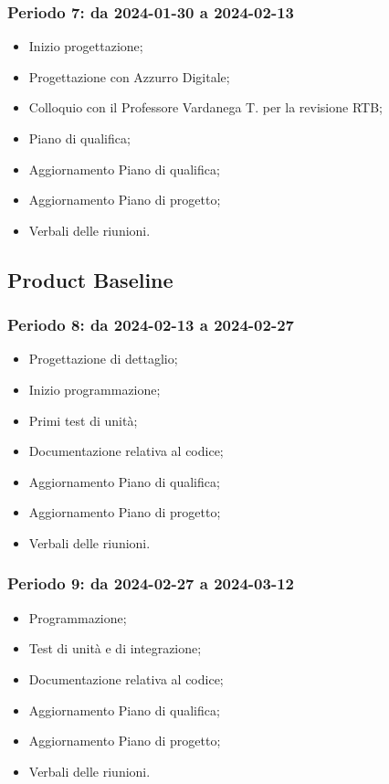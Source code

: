 \documentclass[10pt, a4paper]{article}
\begin{document}
{{{{{{{{\subsubsection{Periodo 7: da 2024-01-30 a 2024-02-13}
%
\begin{itemize}
    \item Inizio progettazione;
    \item Progettazione con Azzurro Digitale;
    \item Colloquio con il Professore Vardanega T. per la revisione RTB;
    \item Piano di qualifica;
    \item Aggiornamento Piano di qualifica;
    \item Aggiornamento Piano di progetto;
    \item Verbali delle riunioni.
\end{itemize}

\subsection{Product Baseline}

\subsubsection{Periodo 8: da 2024-02-13 a 2024-02-27}
%
\begin{itemize}
    \item Progettazione di dettaglio;
    \item Inizio programmazione;
    \item Primi test di unità;
    \item Documentazione relativa al codice;
    \item Aggiornamento Piano di qualifica;
    \item Aggiornamento Piano di progetto;
    \item Verbali delle riunioni.
\end{itemize}

\subsubsection{Periodo 9: da 2024-02-27 a 2024-03-12}
%
\begin{itemize}
    \item Programmazione;
    \item Test di unità e di integrazione;
    \item Documentazione relativa al codice;
    \item Aggiornamento Piano di qualifica;
    \item Aggiornamento Piano di progetto;
    \item Verbali delle riunioni.
\end{itemize}

}}}}}}}}
\end{document}
